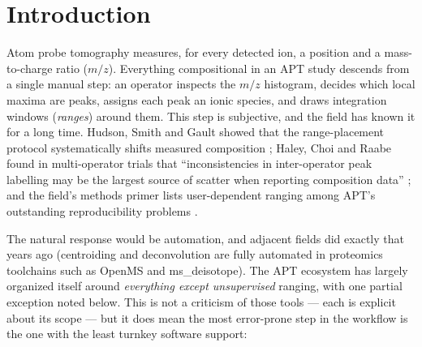 \documentclass[11pt]{article}
\newcommand{\rf}{\textsc{Rangefinder}}
\begin{document}
\begin{abstract}
open tools cover the same stage,
we evaluate six of them (APAV, PyCCAPT, pyOpenMS, ms\_deisotope, APyT, and
a na\"ive-sideband baseline) not as rival end-to-end systems but as
ablations of individual pipeline stages, and add a dedicated detection
ablation against the standard 1D mass-spectrum detectors APT ranging never
adopted (CWT ridge lines, persistent homology, derivative zero-crossings).
The end-to-end evaluation spans synthetic ground-truth specimens and eleven
public APT reference datasets covering pure metals, steels, alloys, an
oxide, and a nitride. Separate detector-only transfer checks use 120
MassBank-derived semi-synthetic spectra and real ToF-SIMS spectra; they do
not validate species assignment or composition outside APT. On the
complete-case APT benchmark, \rf{} has the lowest aggregate composition
error and mass error while retaining 1.000 intensity-weighted synthetic-line
recall and 0.984 precision; it processes a 7.7M-event specimen in under ten
seconds. All datasets, metrics, and the benchmark harness are released with
the code, and every number in this paper regenerates from the documented
commands.
\end{abstract}

\section{Introduction}
\label{sec:intro_gap}

Atom probe tomography measures, for every detected ion, a position and a
mass-to-charge ratio ($m/z$). Everything compositional in an APT study
descends from a single manual step: an operator inspects the $m/z$
histogram, decides which local maxima are peaks, assigns each peak an ionic
species, and draws integration windows (\emph{ranges}) around them. This
step is subjective, and the field has known it for a long time. Hudson,
Smith and Gault showed that the range-placement protocol systematically
shifts measured composition \citep{hudson2011}; Haley, Choi and Raabe found
in multi-operator trials that ``inconsistencies in inter-operator peak
labelling may be the largest source of scatter when reporting composition
data'' \citep{haley2015guided}; and the field's methods primer lists
user-dependent ranging among APT's outstanding reproducibility problems
\citep{gault2021primer}.

The natural response would be automation, and adjacent fields did exactly
that years ago (centroiding and deconvolution are fully automated in
proteomics toolchains such as OpenMS \citep{rost2016openms} and
ms\_deisotope). The APT ecosystem has largely organized itself around
\emph{everything except unsupervised} ranging, with one partial exception
noted below. This is not a criticism of those tools --- each is explicit
about its scope --- but it does mean the most error-prone step in the
workflow is the one with the least turnkey software support:
\end{document}
